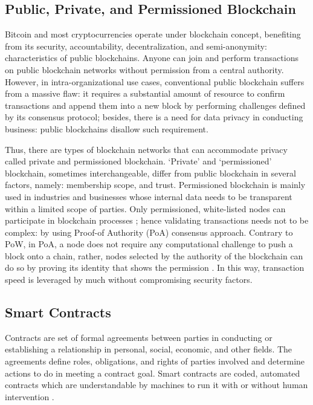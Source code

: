 \documentclass[a4paper,12pt,oneside, utf8x]{report}
\begin{document}
\subsection{Public, Private, and Permissioned Blockchain}

Bitcoin and most cryptocurrencies operate under blockchain concept, benefiting from its security, accountability, decentralization, and semi-anonymity: characteristics of public blockchains. Anyone can join and perform transactions on public blockchain networks without permission from a central authority. However, in intra-organizational use cases, conventional public blockchain suffers from a massive flaw: it requires a substantial amount of resource to confirm transactions and append them into a new block by performing challenges defined by its consensus protocol; besides, there is a need for data privacy in conducting business: public blockchains disallow such requirement.

Thus, there are types of blockchain networks that can accommodate privacy called private and permissioned blockchain. ‘Private’ and ‘permissioned’ blockchain, sometimes interchangeable, differ from public blockchain in several factors, namely: membership scope, and trust. Permissioned blockchain is mainly used in industries and businesses whose internal data needs to be transparent within a limited scope of parties. Only permissioned, white-listed nodes can participate in blockchain processes \cite{n28}; hence validating transactions needs not to be complex: by using Proof-of Authority (PoA) consensus approach. Contrary to PoW, in PoA, a node does not require any computational challenge to push a block onto a chain, rather, nodes selected by the authority of the blockchain can do so by proving its identity that shows the permission \cite{y44}. In this way, transaction speed is leveraged by much without compromising security factors.

\subsection{Smart Contracts}

Contracts are set of formal agreements between parties in conducting or establishing a relationship in personal, social, economic, and other fields. The agreements define roles, obligations, and rights of parties involved and determine actions to do in meeting a contract goal. Smart contracts are coded, automated contracts which are understandable by machines to run it with or without human intervention \cite{y23}.
\end{document}
